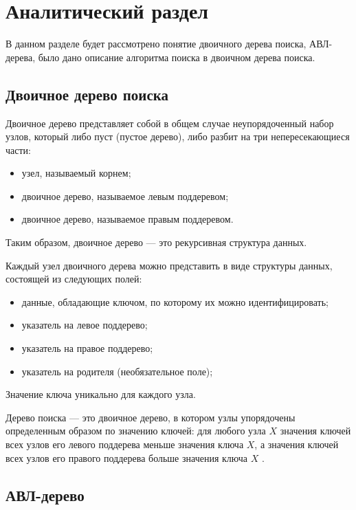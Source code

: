 \chapter{Аналитический раздел}

В данном разделе будет рассмотрено понятие двоичного дерева поиска, АВЛ-дерева, было дано описание алгоритма поиска в двоичном дерева поиска.

\section{Двоичное дерево поиска}

Двоичное дерево представляет собой в общем случае неупорядоченный набор узлов, который либо пуст (пустое дерево), либо разбит на три непересекающиеся части:

\begin{itemize}[label*=--]
	\item узел, называемый корнем;
	\item двоичное дерево, называемое левым поддеревом;
	\item двоичное дерево, называемое правым поддеревом.
\end{itemize}

Таким образом, двоичное дерево --- это рекурсивная структура данных.

Каждый узел двоичного дерева можно представить в виде структуры данных, состоящей из следующих полей:

\begin{itemize}[label*=--]
	\item данные, обладающие ключом, по которому их можно идентифицировать;
	\item указатель на левое поддерево;
	\item указатель на правое поддерево;
	\item указатель на родителя (необязательное поле);
\end{itemize}

Значение ключа уникально для каждого узла.

Дерево поиска --- это двоичное дерево, в котором узлы упорядочены определенным образом по значению ключей: для любого узла $X$ значения ключей всех узлов его левого поддерева меньше значения ключа $X$, а значения ключей всех узлов его правого поддерева больше значения ключа $X$ \cite{info_book_bst}.

\section{АВЛ-дерево}

